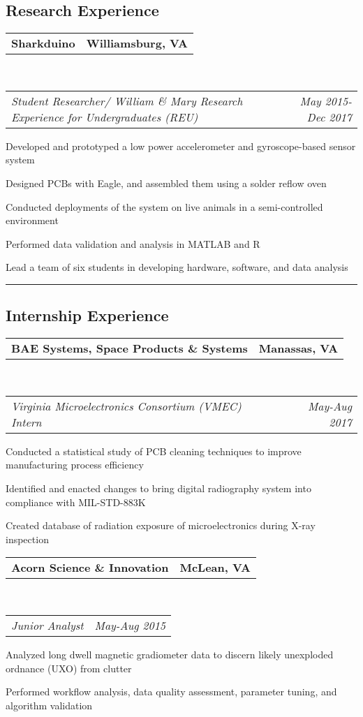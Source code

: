 \documentclass[10pt,letterpaper]{article}
\makeatletter
\newcommand{\headerrow}[2]
{\begin{tabular*}{\linewidth}{l@{\extracolsep{\fill}}r}
	#1 &
	#2 \\
\end{tabular*}}
\makeatother
\begin{document}
\subsection*{Research Experience}

	\headerrow
		{\textbf{Sharkduino}}
		{\textbf{Williamsburg, VA}}
	\\
	\headerrow
		{\emph{Student Researcher/ William \& Mary Research Experience for Undergraduates (REU)}}
		{\emph{May 2015-Dec 2017}}
	\begin{itemize*}
	\item Developed and prototyped a low power accelerometer and gyroscope-based sensor system
	\item Designed PCBs with Eagle, and assembled them using a solder reflow oven
	\item Conducted deployments of the system on live animals in a semi-controlled environment
	\item Performed data validation and analysis in MATLAB and R
	\item Lead a team of six students in developing hardware, software, and data analysis
	\end{itemize*}
	
\hrule
\vspace{-0.4em}
\subsection*{Internship Experience}
\headerrow
		{\textbf{BAE Systems, Space Products \& Systems}}
		{\textbf{Manassas, VA}}
	\\
	\headerrow
		{\emph{Virginia Microelectronics Consortium (VMEC) Intern}}
		{\emph{May-Aug 2017}}
\begin{itemize*}
		\item Conducted a statistical study of PCB cleaning techniques to improve manufacturing process efficiency
		\item Identified and enacted changes to bring digital radiography system into compliance with MIL-STD-883K
		\item Created database of radiation exposure of microelectronics during X-ray inspection
	\end{itemize*}
	\headerrow
		{\textbf{Acorn Science \& Innovation}}
		{\textbf{McLean, VA}}
	\\
	\headerrow
		{\emph{Junior Analyst}}
		{\emph{May-Aug 2015}}
	\begin{itemize*}
		\item Analyzed long dwell magnetic gradiometer data to
			discern likely unexploded ordnance (UXO) from clutter
		\item Performed workflow analysis, data quality assessment, parameter tuning, and algorithm validation
	\end{itemize*}
	
\end{document}
